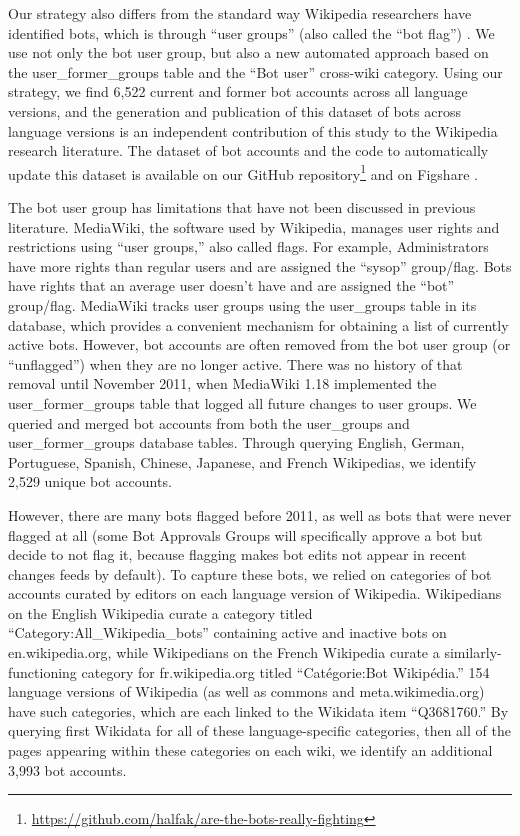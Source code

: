 \documentclass[format=acmsmall, review=false, screen=true]{acmart}%
\begin{document}
Our strategy also differs from the standard way Wikipedia researchers have identified bots, which is through ``user groups'' (also called the ``bot flag'') \cite{Geiger2009, Kittur2007, Mestyan2013, Ortega2007, West2010}. We use not only the bot user group, but also a new automated approach based on the user\_former\_groups table and the ``Bot user'' cross-wiki category. Using our strategy, we find 6,522 current and former bot accounts across all language versions, and the generation and publication of this dataset of bots across language versions is an independent contribution of this study to the Wikipedia research literature. The dataset of bot accounts and the code to automatically update this dataset is available on our GitHub repository\footnote{ \url{https://github.com/halfak/are-the-bots-really-fighting} } and on Figshare \cite{figshare}.

The bot user group has limitations that have not been discussed in previous literature. MediaWiki, the software used by Wikipedia, manages user rights and restrictions using ``user groups,'' also called flags. For example, Administrators have more rights than regular users and are assigned the ``sysop'' group/flag. Bots have rights that an average user doesn't have and are assigned the ``bot'' group/flag. MediaWiki tracks user groups using the user\_groups table in its database, which provides a convenient mechanism for obtaining a list of currently active bots. However, bot accounts are often removed from the bot user group (or ``unflagged'') when they are no longer active. There was no history of that removal until November 2011, when MediaWiki 1.18 implemented the user\_former\_groups table that logged all future changes to user groups. We queried and merged bot accounts from both the user\_groups and user\_former\_groups database tables. Through querying English, German, Portuguese, Spanish, Chinese, Japanese, and French Wikipedias, we identify 2,529 unique bot accounts.   

However, there are many bots flagged before 2011, as well as bots that were never flagged at all (some Bot Approvals Groups will specifically approve a bot but decide to not flag it, because flagging makes bot edits not appear in recent changes feeds by default). To capture these bots, we relied on categories of bot accounts curated by editors on each language version of Wikipedia. Wikipedians on the English Wikipedia curate a category titled ``Category:All\_Wikipedia\_bots'' containing active and inactive bots on en.wikipedia.org, while Wikipedians on the French Wikipedia curate a similarly-functioning category for fr.wikipedia.org titled ``Catégorie:Bot Wikipédia.'' 154 language versions of Wikipedia (as well as commons and meta.wikimedia.org) have such categories, which are each linked to the Wikidata item ``Q3681760.'' By querying first Wikidata for all of these language-specific categories, then all of the pages appearing within these categories on each wiki, we identify an additional 3,993 bot accounts.
\end{document}
